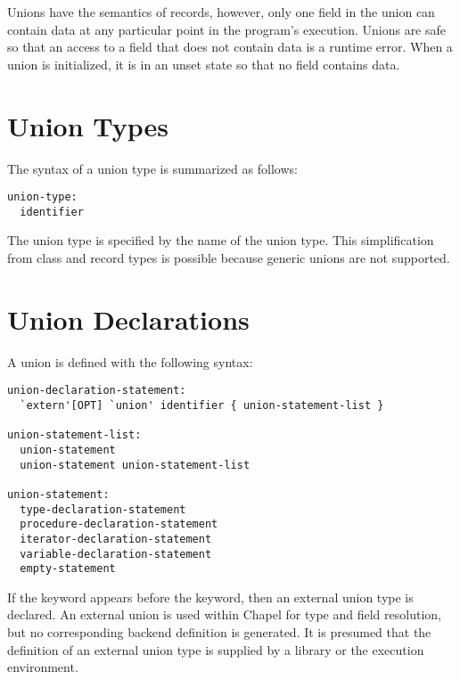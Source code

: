 \label{Unions}

Unions have the semantics of records, however, only one field in the
union can contain data at any particular point in the program's
execution.  Unions are safe so that an access to a field that does not
contain data is a runtime error.  When a union is initialized, it is
in an unset state so that no field contains data.

\section{Union Types}
\label{Union_Types}

The syntax of a union type is summarized as follows:
\begin{syntax}
\begin{verbatim}
union-type:
  identifier
\end{verbatim}
\end{syntax}
The union type is specified by the name of the union type.  This
simplification from class and record types is possible because generic
unions are not supported.

\section{Union Declarations}
\label{Union_Declarations}

A union is defined with the following syntax:
\begin{syntax}
\begin{verbatim}
union-declaration-statement:
  `extern'[OPT] `union' identifier { union-statement-list }

union-statement-list:
  union-statement
  union-statement union-statement-list

union-statement:
  type-declaration-statement
  procedure-declaration-statement
  iterator-declaration-statement
  variable-declaration-statement
  empty-statement
\end{verbatim}
\end{syntax}

If the  keyword appears before the  keyword, then an
external union type is declared.  An external union is used within Chapel
for type and field resolution, but no corresponding backend definition is
generated.  It is presumed that the definition of an external union type is supplied
by a library or the execution environment.

